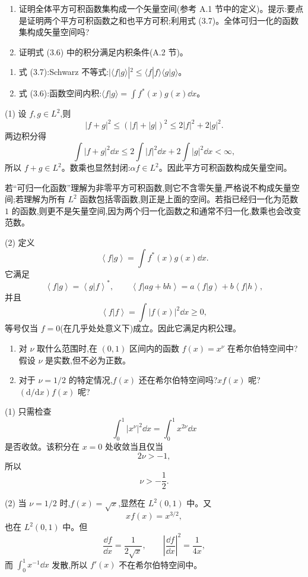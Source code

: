 \begin{question}
\begin{enumerate}
\item 证明全体平方可积函数集构成一个矢量空间(参考 A.1 节中的定义)。提示:要点是证明两个平方可积函数之和也平方可积;利用式 (3.7)。全体可归一化的函数集构成矢量空间吗?
\item 证明式 (3.6) 中的积分满足内积条件(A.2 节)。
\end{enumerate}

\par\smallskip
{}
\begin{enumerate}[leftmargin=2.2em,itemsep=0.12em,topsep=0.12em,parsep=0pt]
\item 式 (3.7):Schwarz 不等式:$|\langle f|g\rangle|^2\le \langle f|f\rangle\langle g|g\rangle$。
\item 式 (3.6):函数空间内积:$\langle f|g\rangle=\int f^*(x)g(x)\dd x$。
\end{enumerate}

\begin{solution}
(1) 设 $f,g\in L^2$,则
\[
|f+g|^2\le (|f|+|g|)^2\le 2|f|^2+2|g|^2 .
\]
两边积分得
\[
\int |f+g|^2\dd x\le 2\int |f|^2\dd x+2\int |g|^2\dd x<\infty,
\]
所以 $f+g\in L^2$。数乘也显然封闭:$\alpha f\in L^2$。因此平方可积函数构成矢量空间。

若“可归一化函数”理解为非零平方可积函数,则它不含零矢量,严格说不构成矢量空间;若理解为所有 $L^2$ 函数包括零函数,则正是上面的空间。若指已经归一化为范数 $1$ 的函数,则更不是矢量空间,因为两个归一化函数之和通常不归一化,数乘也会改变范数。

(2) 定义
\[
\left\langle f|g \right\rangle=\int f^*(x)g(x)\dd x .
\]
它满足
\[
\left\langle f|g \right\rangle=\left\langle g|f \right\rangle^*,\qquad
\left\langle f|ag+bh \right\rangle=a\left\langle f|g \right\rangle+b\left\langle f|h \right\rangle,
\]
并且
\[
\left\langle f|f \right\rangle=\int |f(x)|^2\dd x\ge 0,
\]
等号仅当 $f=0$(在几乎处处意义下)成立。因此它满足内积公理。
\end{solution}
\end{question}

\begin{question}
\begin{enumerate}
\item 对 $\nu$ 取什么范围时,在 $(0,1)$ 区间内的函数 $f(x)=x^\nu$ 在希尔伯特空间中?假设 $\nu$ 是实数,但不必为正数。
\item 对于 $\nu=1/2$ 的特定情况,$f(x)$ 还在希尔伯特空间吗?$x f(x)$ 呢?$(\mathrm d/\mathrm dx)f(x)$ 呢?
\end{enumerate}
\begin{solution}
(1) 只需检查
\[
\int_0^1 |x^\nu|^2\dd x=\int_0^1 x^{2\nu}\dd x
\]
是否收敛。该积分在 $x=0$ 处收敛当且仅当
\[
2\nu>-1,
\]
所以
\[
\boxed{\nu>-\frac12.}
\]

(2) 当 $\nu=1/2$ 时,$f(x)=\sqrt{x}$,显然在 $L^2(0,1)$ 中。又
\[
xf(x)=x^{3/2},
\]
也在 $L^2(0,1)$ 中。但
\[
\frac{\dd f}{\dd x}=\frac1{2\sqrt{x}},
\qquad
\left|\frac{\dd f}{\dd x}\right|^2=\frac1{4x},
\]
而 $\int_0^1 x^{-1}\dd x$ 发散,所以 $f'(x)$ 不在希尔伯特空间中。
\end{solution}
\end{question}

